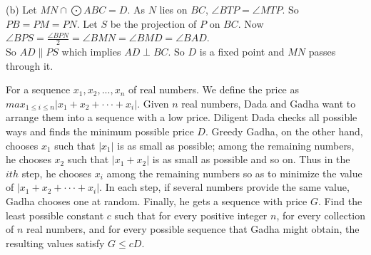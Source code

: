 \documentclass{subfile}
\begin{document}
\begin{solution}
		
		(b) Let $MN\cap \bigodot ABC=D$.
		As $N$ lies on $BC$, $\angle BTP=\angle MTP$. So $PB=PM=PN$.
		Let $S$ be the projection of $P$ on $BC$.
		Now $\angle BPS=\frac{\angle BPN}{2}=\angle BMN=\angle BMD=\angle BAD$.\\
		So $AD\parallel PS$ which implies $AD\perp BC$. So $D$ is a fixed point and $MN$ passes through it.
		\end{solution}   
		
		\begin{problem}
			For a sequence $x_1 ,x_2 ,...,x_n$ of real numbers. We define the price as $max_{1≤i≤n}|x_1 + x_2 + ··· + x_i |$.
			Given $n$ real numbers, Dada and Gadha want to arrange them into a sequence with a low price.
			Diligent Dada checks all possible ways and finds the minimum possible price $D$. Greedy Gadha, on
			the other hand, chooses $x_1$ such that $|x_1|$ is as small as possible; among the remaining numbers, he
			chooses $x_2$ such that $|x_1 + x_2 |$ is as small as possible and so on. Thus in the $ith$ step, he chooses $x_i$
			among the remaining numbers so as to minimize the value of $|x_1 + x_2 + ··· + x_i |$. In each step, if
			several numbers provide the same value, Gadha chooses one at random. Finally, he gets a sequence
			with price $G$.
			Find the least possible constant $c$ such that for every positive integer $n$, for every collection of $n$
			real numbers, and for every possible sequence that Gadha might obtain, the resulting values satisfy
			$G \leq cD$.
		\end{problem}
		
\end{document}
